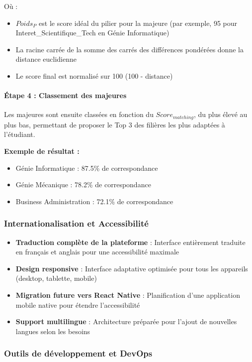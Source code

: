 \documentclass[12pt,a4paper]{report}
\begin{document}
Où :
\begin{itemize}
    \item $Poids_P$ est le score idéal du pilier pour la majeure (par exemple, 95 pour Interet\_Scientifique\_Tech en Génie Informatique)
    \item La racine carrée de la somme des carrés des différences pondérées donne la distance euclidienne
    \item Le score final est normalisé sur 100 (100 - distance)
\end{itemize}

\paragraph{Étape 4 : Classement des majeures}
Les majeures sont ensuite classées en fonction du $Score_{matching}$, du plus élevé au plus bas, permettant de proposer le Top 3 des filières les plus adaptées à l'étudiant.

\textbf{Exemple de résultat :}
\begin{itemize}
    \item Génie Informatique : 87.5\% de correspondance
    \item Génie Mécanique : 78.2\% de correspondance  
    \item Business Administration : 72.1\% de correspondance
\end{itemize}

\subsubsection{Internationalisation et Accessibilité}

\begin{itemize}
    \item \textbf{Traduction complète de la plateforme} : Interface entièrement traduite en français et anglais pour une accessibilité maximale
    \item \textbf{Design responsive} : Interface adaptative optimisée pour tous les appareils (desktop, tablette, mobile)
    \item \textbf{Migration future vers React Native} : Planification d'une application mobile native pour étendre l'accessibilité
    \item \textbf{Support multilingue} : Architecture préparée pour l'ajout de nouvelles langues selon les besoins
\end{itemize}

\subsubsection{Outils de développement et DevOps}
\end{document}
